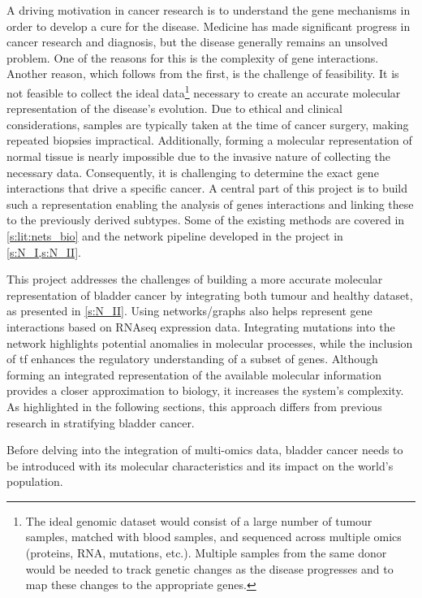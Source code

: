 A driving motivation in cancer research is to understand the gene mechanisms in order to develop a cure for the disease. Medicine has made significant progress in cancer research and diagnosis, but the disease generally remains an unsolved problem. One of the reasons for this is the complexity of gene interactions. Another reason, which follows from the first, is the challenge of feasibility. It is not feasible to collect the ideal data\footnote{The ideal genomic dataset would consist of a large number of tumour samples, matched with blood samples, and sequenced across multiple omics (proteins, RNA, mutations, etc.). Multiple samples from the same donor would be needed to track genetic changes as the disease progresses and to map these changes to the appropriate genes.} necessary to create an accurate molecular representation of the disease's evolution. Due to ethical and clinical considerations, samples are typically taken at the time of cancer surgery, making repeated biopsies impractical. Additionally, forming a molecular representation of normal tissue is nearly impossible due to the invasive nature of collecting the necessary data. Consequently, it is challenging to determine the exact gene interactions that drive a specific cancer. A central part of this project is to build such a representation enabling the analysis of genes interactions and linking these to the previously derived subtypes. Some of the existing methods are covered in \cref{s:lit:nets_bio} and the network pipeline developed in the project in \cref{s:N_I,s:N_II}.

This project addresses the challenges of building a more accurate molecular representation of bladder cancer by integrating both tumour and healthy dataset, as presented in \cref{s:N_II}. Using networks/graphs also helps represent gene interactions based on RNAseq expression data. Integrating mutations into the network highlights potential anomalies in molecular processes, while the inclusion of \acrshort{tf} enhances the regulatory understanding of a subset of genes. Although forming an integrated representation of the available molecular information provides a closer approximation to biology, it increases the system's complexity. As highlighted in the following sections, this approach differs from previous research in stratifying bladder cancer.


Before delving into the integration of multi-omics data, bladder cancer needs to be introduced with its molecular characteristics and its impact on the world's population.


